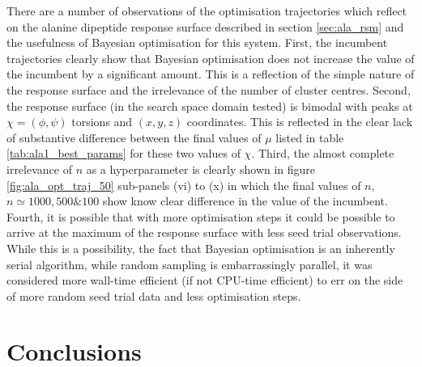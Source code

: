 There are a number of observations of the optimisation trajectories which reflect on the alanine dipeptide response surface described in section \ref{sec:ala_rsm} and the usefulness of Bayesian optimisation for this system. First, the incumbent trajectories clearly show that Bayesian optimisation does not increase the value of the incumbent by a significant amount. This is a reflection of the simple nature of the response surface and the irrelevance of the number of cluster centres. Second, the response surface (in the search space domain tested) is bimodal with peaks at $\chi=(\phi, \psi)$ torsions and $(x, y, z)$ coordinates. This is reflected in the clear lack of substantive difference between the final values of $\mu$ listed in table \ref{tab:ala1_best_params} for these two values of $\chi$.  Third, the almost complete irrelevance of $n$ as a hyperparameter is clearly shown in figure \ref{fig:ala_opt_traj_50} sub-panels (vi) to (x) in which the final values of $n$, $n \simeq 1000, 500 \& 100$ show know clear difference in the value of the incumbent. Fourth, it is possible that with more optimisation steps it could be possible to arrive at the maximum of the response surface with less seed trial observations. While this is a possibility, the fact that Bayesian optimisation is an inherently serial algorithm, while random sampling is embarrassingly parallel, it was considered more wall-time efficient (if not CPU-time efficient) to err on the side of more random seed trial data and less optimisation steps. 

\section{Conclusions}\label{sec:msm_conc}

